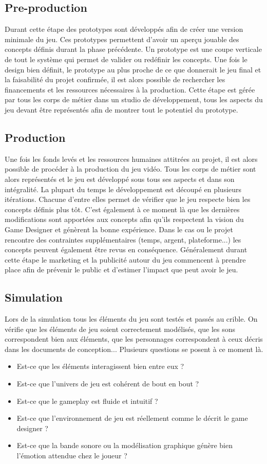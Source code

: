 \subsection{Pre-production}
Durant cette étape des prototypes sont développés afin de créer une version minimale du jeu. Ces prototypes permettent d'avoir un aperçu jouable des concepts définis durant la phase précédente. Un prototype est une coupe verticale de tout le système qui permet de valider ou redéfinir les concepts. Une fois le design bien définit, le prototype au plus proche de ce que donnerait le jeu final et la faisabilité du projet confirmée, il est alors possible de rechercher les financements et les ressources nécessaires à la production. Cette étape est gérée par tous les corps de métier dans un studio de développement, tous les aspects du jeu devant être représentés afin de montrer tout le potentiel du prototype.

\subsection{Production}
Une fois les fonds levés et les ressources humaines attitrées au projet, il est alors possible de procéder à la production du jeu vidéo. Tous les corps de métier sont alors représentés et le jeu est développé sous tous ses aspects et dans son intégralité. La plupart du temps le développement est découpé en plusieurs itérations. Chacune d'entre elles permet de vérifier que le jeu respecte bien les concepts définis plus tôt. C'est également à ce moment là que les dernières modifications sont apportées aux concepts afin qu'ils respectent la vision du Game Designer et génèrent la bonne expérience. Dans le cas ou le projet rencontre des contraintes supplémentaires (temps, argent, plateforme...) les concepts peuvent également être revus en conséquence. Généralement durant cette étape le marketing et la publicité autour du jeu commencent à prendre place afin de prévenir le public et d'estimer l'impact que peut avoir le jeu.

\subsection{Simulation}
Lors de la simulation tous les éléments du jeu sont testés et passés au crible. On vérifie que les éléments de jeu soient correctement modélisés, que les sons correspondent bien aux éléments, que les personnages correspondent à ceux décris dans les documents de conception... Plusieurs questions se posent à ce moment là. 
\begin{itemize}
    \item Est-ce que les éléments interagissent bien entre eux ?
    \item Est-ce que l'univers de jeu est cohérent de bout en bout ?
    \item Est-ce que le gameplay est fluide et intuitif ?
    \item Est-ce que l'environnement de jeu est réellement comme le décrit le game designer ?
    \item Est-ce que la bande sonore ou la modélisation graphique génère bien l'émotion attendue chez le joueur ?
\end{itemize}

